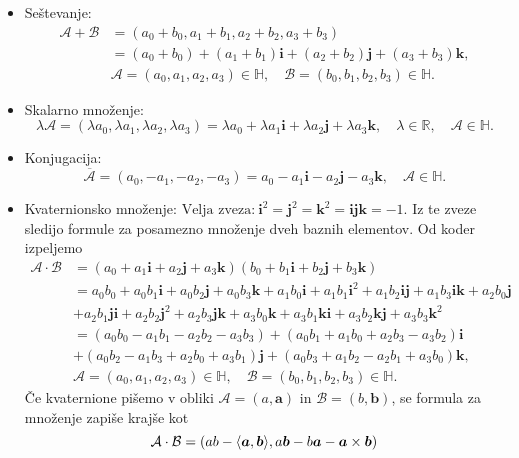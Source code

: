 \documentclass[mat1]{fmfdelo}
\newcommand{\R}{\mathbb R}
\newcommand{\HH}{\mathbb H}
\newcommand{\ii}{\boldsymbol i}
\newcommand{\jj}{\boldsymbol j}
\newcommand{\kk}{\boldsymbol k}
\newcommand{\ba}{\boldsymbol a}
\newcommand{\bb}{\boldsymbol b}
\newcommand{\A}{\mathcal A}
\newcommand{\B}{\mathcal B}
\begin{document}
\begin{itemize}
\item Seštevanje:
\begin{equation*}
\begin{split}
\A + \B &= (a_0+b_0,a_1+b_1,a_2+b_2,a_3+b_3)  \\
 		  &=(a_0+b_0) + (a_1+b_1)\mathbf{i} + (a_2+b_2)\mathbf{j} + (a_3+b_3)\mathbf{k}, \\
 		  &  		  \A = (a_0,a_1,a_2,a_3) \in \HH, \quad \B = (b_0,b_1,b_2,b_3) \in \HH.
\end{split}
\end{equation*}
\item Skalarno množenje:
\begin{equation*}
\lambda \A = (\lambda a_0, \lambda a_1, \lambda a_2, \lambda a_3) =  \lambda a_0 + \lambda a_1 \mathbf{i} + \lambda a_2 \mathbf{j} + \lambda a_3 \mathbf{k}, \quad \lambda \in \R,\quad \A \in \HH.
\end{equation*}
\item Konjugacija:
\begin{equation*}
\overline{\A} = (a_0,-a_1,-a_2,-a_3)= a_0-a_1\mathbf{i} - a_2\mathbf{j} - a_3\mathbf{k}, \quad \A \in \HH .
\end{equation*}
\item Kvaternionsko množenje:
$\text{Velja zveza:}~\mathbf{i}^2 = \mathbf{j}^2 = \mathbf{k}^2 = \mathbf{ijk} = -1$. Iz te zveze sledijo formule za posamezno množenje dveh baznih elementov. Od koder izpeljemo
\begin{equation*}
\begin{split}
\A \cdot \B &= (a_0 + a_1\ii +a_2\jj+a_3\kk)(b_0+b_1\ii+b_2\jj+b_3\kk) \\
&=a_0b_0+a_0b_1\ii+a_0b_2\jj+a_0b_3\kk+a_1b_0\ii+a_1b_1\ii^2+a_1b_2\ii\jj+a_1b_3\ii\kk+a_2b_0\jj\\
&+a_2b_1\jj\ii+a_2b_2\jj^2+a_2b_3\jj\kk+a_3b_0\kk+a_3b_1\kk\ii+a_3b_2\kk\jj+a_3b_3\kk^2\\
&=(a_0b_0-a_1b_1-a_2b_2-a_3b_3) +(a_0b_1+a_1b_0+a_2b_3-a_3b_2)\ii \\
&+(a_0b_2-a_1b_3+a_2b_0+a_3b_1)\jj +(a_0b_3+a_1b_2-a_2b_1+a_3b_0)\kk,\\
&\A = (a_0,a_1,a_2,a_3) \in \HH, \quad \B = (b_0,b_1,b_2,b_3) \in \HH.
\end{split}
\end{equation*}
Če kvaternione pišemo v obliki $\A=(a,\ba)$ in $\B=(b,\bb)$, se formula za množenje zapiše krajše kot
\begin{equation}{\label{mn_kvat}}
	\A \cdot \B = \left( ab-\langle \ba,\bb \rangle, a\bb-b\ba-\ba \times \bb\right)
\end{equation}
\end{itemize}
\end{document}

